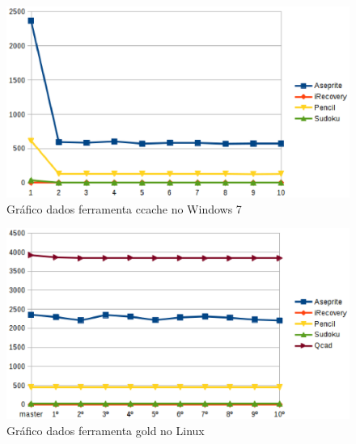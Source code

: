         \begin{figure}[!h]
            \centering
                \includegraphics{figuras/graficos/windows_ccache.eps}
            \caption{Gráfico dados ferramenta ccache no Windows 7}
            \label{grafico_cache_windows}
        \end{figure}
        \begin{figure}[!h]
            \centering
                \includegraphics{figuras/graficos/linux_gold.eps}
            \caption{Gráfico dados ferramenta gold no Linux}
            \label{grafico_cache_windows}
        \end{figure}


